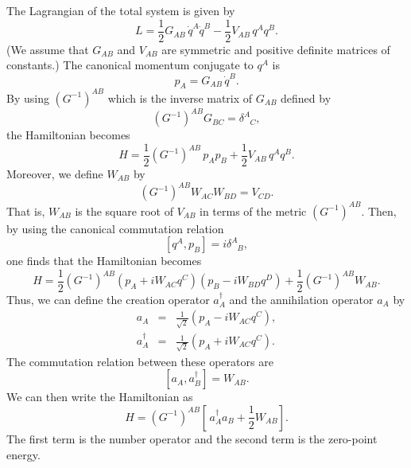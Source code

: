 \documentclass[12pt,epsf]{article}
\def\Sp{\phantom{A}}
\begin{document}
The Lagrangian of the total system is given by
\begin{equation}
L=\frac{1}{2} G_{AB}\,\dot{q}^A\dot{q}^B-
   \frac{1}{2} V_{AB}\,q^Aq^B.
\label{Lagra}
\end{equation}
(We assume that $G_{AB}$ and $V_{AB}$ are symmetric and
positive definite matrices of constants.)
The canonical momentum conjugate to $q^A$ is
\begin{equation}
 p_A=G_{AB}\,\dot{q}^B.
\end{equation}
By using $(G^{-1})^{AB}$ which is the inverse matrix of $G_{AB}$
defined by
\begin{equation}
  (G^{-1})^{AB}G_{BC}=\delta^A_{\Sp C},
\end{equation}
the Hamiltonian becomes
\begin{equation}
  H=\frac{1}{2}(G^{-1})^{AB} \,p_Ap_B+
   \frac{1}{2} V_{AB}\,q^Aq^B.
\end{equation}
Moreover, we define $W_{AB}$ by
\begin{equation}
(G^{-1})^{AB} W_{AC}W_{BD}=V_{CD}.
\end{equation}
That is, $W_{AB}$ is the square root of $V_{AB}$
in terms of the metric $(G^{-1})^{AB}$.
Then, by using the canonical commutation relation
\begin{equation}
  \left[ q^A,p_B \right] =i \delta^A_{\Sp B},
\end{equation}
one finds that the Hamiltonian becomes
\begin{equation}
H=\frac{1}{2}(G^{-1})^{AB}
  \left(p_A+iW_{AC}q^C\right)\left(p_B-iW_{BD}q^D\right)
   +\frac{1}{2}(G^{-1})^{AB}W_{AB}.
\end{equation}
Thus, we can define the creation operator $a^\dagger_A$ and
the annihilation operator $a_A$ by
\begin{eqnarray}
   a_A &=& \frac{1}{\sqrt{2}}\left(p_A-iW_{AC}q^C\right), \\
   a^\dagger_A &=& \frac{1}{\sqrt{2}}
                \left(p_A+iW_{AC}q^C\right).
\end{eqnarray}
The commutation relation between these operators are
\begin{equation}
  \left[ a_A, a^\dagger_B\right]=W_{AB}.
\end{equation}
We can then write the Hamiltonian as
\begin{equation}
  H=(G^{-1})^{AB}\left[\,a^\dagger_Aa_B+
      \frac{1}{2}W_{AB}\right].
\end{equation}
The first term is the number operator and
the second term is the zero-point energy.
\end{document}
